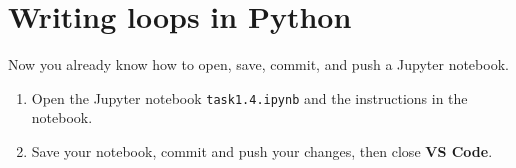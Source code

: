 \documentclass[12pt,a4paper]{article}
\begin{document}
\section{Writing loops in Python}
Now you already know how to open, save, commit, and push a Jupyter notebook.
\begin{enumerate}
    \item Open the Jupyter notebook \texttt{task1.4.ipynb} and the instructions in the notebook.
    \item Save your notebook, commit and push your changes, then close \textbf{VS Code}.
\end{enumerate}
\end{document}
